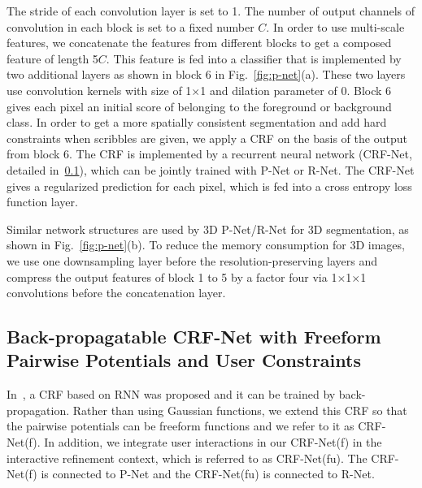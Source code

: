 \documentclass[10pt,journal,compsoc]{IEEEtran}
\begin{document}
The stride of each convolution layer is set to 1. The number of output channels of convolution in each block is set to a fixed number $C$. In order to use multi-scale features, we concatenate the features from different blocks to get a composed feature of length 5$C$. This feature is fed into a classifier that is implemented by two additional layers as shown  in block 6 in Fig.~\ref{fig:p-net}(a). These two layers use  convolution kernels with size of 1$\times$1 and dilation parameter of 0. Block 6 gives each pixel an initial score of belonging to the foreground or background class. In order to get a more spatially consistent segmentation and add hard constraints when scribbles are given, we apply a CRF on the basis of the output from block 6. The CRF is implemented by a recurrent neural network (CRF-Net, detailed in~\ref{method:crf}), which can be jointly trained with P-Net or R-Net. The CRF-Net gives a regularized prediction for each pixel, which is fed into a cross entropy loss function layer.


Similar network structures are used by 3D P-Net/R-Net for 3D segmentation, as shown in Fig.~\ref{fig:p-net}(b). To reduce the memory consumption for 3D images, we use one downsampling layer before the resolution-preserving layers and compress the output features of block 1 to 5 by a factor four via 1$\times$1$\times$1 convolutions before the concatenation layer. 


\subsection{Back-propagatable CRF-Net with Freeform Pairwise Potentials and User Constraints}\label{method:crf}
In~\cite{Zheng2015a}, a CRF based on RNN was proposed and it can be trained by back-propagation. Rather than using Gaussian functions, we extend this CRF so that the pairwise potentials can be freeform functions and we refer to it as CRF-Net(f). In addition, we integrate user interactions in our CRF-Net(f) in the interactive refinement context, which is referred to as CRF-Net(fu). The CRF-Net(f) is connected to P-Net and the CRF-Net(fu) is connected to R-Net.
\end{document}
